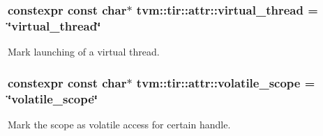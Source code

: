 \subsubsection[{\texorpdfstring{virtual\+\_\+thread}{virtual_thread}}]{\setlength{\rightskip}{0pt plus 5cm}constexpr const char$\ast$ tvm\+::tir\+::attr\+::virtual\+\_\+thread = \char`\"{}virtual\+\_\+thread\char`\"{}}\hypertarget{namespacetvm_1_1tir_1_1attr_a464533c1560ace5e0b5071ba6902482e}{}\label{namespacetvm_1_1tir_1_1attr_a464533c1560ace5e0b5071ba6902482e}


Mark launching of a virtual thread. 

\subsubsection[{\texorpdfstring{volatile\+\_\+scope}{volatile_scope}}]{\setlength{\rightskip}{0pt plus 5cm}constexpr const char$\ast$ tvm\+::tir\+::attr\+::volatile\+\_\+scope = \char`\"{}volatile\+\_\+scope\char`\"{}}\hypertarget{namespacetvm_1_1tir_1_1attr_a14c2370f3a08792a6aaf70d7a3c773e4}{}\label{namespacetvm_1_1tir_1_1attr_a14c2370f3a08792a6aaf70d7a3c773e4}


Mark the scope as volatile access for certain handle. 


